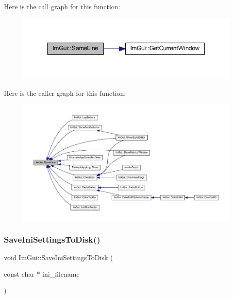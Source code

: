 Here is the call graph for this function\+:
\nopagebreak
\begin{figure}[H]
\begin{center}
\leavevmode
\includegraphics[width=338pt]{namespace_im_gui_a9a01bed1445b5b7edaf0af6a31c08d2c_cgraph}
\end{center}
\end{figure}
Here is the caller graph for this function\+:
\nopagebreak
\begin{figure}[H]
\begin{center}
\leavevmode
\includegraphics[width=350pt]{namespace_im_gui_a9a01bed1445b5b7edaf0af6a31c08d2c_icgraph}
\end{center}
\end{figure}
\mbox{\label{namespace_im_gui_afa4985e7810be4e687bc4ff28cec8a4d}} 
\subsubsection{\texorpdfstring{Save\+Ini\+Settings\+To\+Disk()}{SaveIniSettingsToDisk()}}
{\footnotesize\ttfamily void Im\+Gui\+::\+Save\+Ini\+Settings\+To\+Disk (\begin{DoxyParamCaption}\item[{const char $\ast$}]{ini\+\_\+filename }\end{DoxyParamCaption})}

